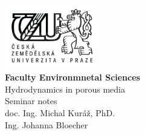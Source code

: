 \begin{titlepage}

 
\begin{center}
 
 

\includegraphics[width=1.65in]{./images/logo.png}\\
 
{\textsf{\bfseries{Faculty Environmnetal Sciences}}}\\[5.5cm]



\textsf{\LARGE Hydrodynamics in porous media}\\[1.0cm]
 
\textsf{\LARGE Seminar notes}\\[1.0cm]
\textsf{ \large doc. Ing. Michal Kuráž, PhD. \\  Ing. Johanna Bloecher} 
 
 \vspace{50mm}
{
 \large
\bf {} }
\end{center}

 

 



\end{titlepage}
